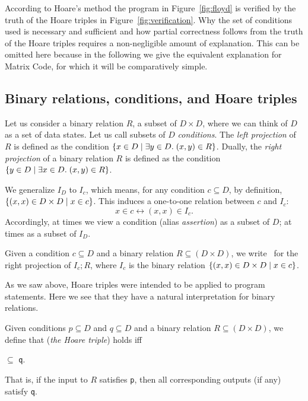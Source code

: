 \documentclass[preprint,11pt]{elsarticle}
\begin{document}
According to Hoare's method
the program in Figure~\ref{fig:floyd}
is verified by the truth of the Hoare triples in
Figure~\ref{fig:verification}.
Why the set of conditions used is necessary and sufficient
and how partial correctness follows from the truth of the
Hoare triples requires a non-negligible amount of explanation.
This can be omitted here because in the following we give
the equivalent explanation for Matrix Code,
for which it will be comparatively simple.

\subsection{Binary relations, conditions, and Hoare triples}

Let us consider a binary relation $R$,
a subset of $D\times D$,
where we can think of $D$ as a set of data states.
Let us call subsets of $D$ \emph{conditions}.
The \emph{left projection} of $R$
is defined as the condition
$\{x \in D \mid \exists y \in D.\; (x,y) \in R\}$.
Dually, the \emph{right projection} of a binary relation $R$
is defined as the condition
$\{y \in D \mid \exists x \in D.\; (x,y) \in R\}$.

We generalize $I_D$ to $I_c$,
which means, for any condition $c \subseteq D$, by definition,
$\{(x,x) \in D \times D \mid x \in c\}$.
This induces a one-to-one relation between $c$ and $I_c$:
$$
x \in c \leftrightarrow (x,x) \in I_c.
$$
Accordingly, at times we view a condition (alias \emph{assertion})
as a subset of $D$; at times as a subset of $I_D$.

\begin{definition}\label{def:projections}
Given a condition $c \subseteq D$
and a binary relation $R \subseteq (D \times D)$,
we write \ for
the right projection of $I_c;R$,
where $I_c$ is the binary relation
$\{(x,x) \in D \times D \mid x \in c\}$.
\end{definition}

As we saw above,
Hoare triples were intended to be applied to program statements.
Here we see that
they have a natural interpretation for binary relations.

\begin{definition}\label{def:triple}
Given conditions
$p \subseteq D$ and $q \subseteq D$
and a binary relation $R \subseteq (D \times D)$,
we define that  (\emph{the Hoare triple})
holds iff
\begin{center} $\subseteq$ {\tt q}.\end{center}
\end{definition}
That is, if the input to $R$ satisfies {\tt p},
then all corresponding outputs (if any) satisfy {\tt q}.
\end{document}
